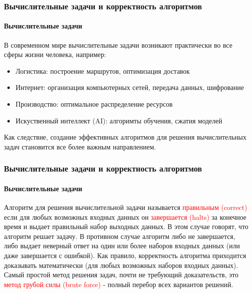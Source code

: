 \documentclass[aspectratio=169]{beamer}
\begin{document}
\begin{frame}
\frametitle{Вычислительные задачи и корректность алгоритмов}
\framesubtitle{Вычислительные задачи}
\justifying
В современном мире вычислительные задачи возникают практически во все сферы жизни человека, например:
\begin{itemize}
\item{Логистика:  построение маршрутов, оптимизация доставок}
\item{Интернет: организация компьютерных сетей, передача данных, шифрование}
\item{Производство: оптимальное распределение ресурсов}
\item{Искуственный интеллект (AI): алгоримты обучения, сжатия моделей}
\end{itemize}

Как следствие, создание эффективных алгоритмов для решения вычислительных задач становится все более важным направлением.

\end{frame}

\begin{frame}
\frametitle{Вычислительные задачи и корректность алгоритмов}
\framesubtitle{Вычислительные задачи}
\justifying
\small
Алгоритм для решения вычислительной задачи называется \textcolor{red}{правильным (correct)} если для любых возможных входных данных он \textcolor{red}{завершается (halts)} за конечное время и выдает правильный набор выходных данных.\newline\newline
В этом случае говорят, что алгоритм решает задачу. В противном случае алгоритм либо не завершается, либо выдает неверный ответ на один или более наборов входных данных (или даже завершается с ошибкой).\newline\newline
Как правило, корректность алгоритма приходится доказывать математически (для любых возможных наборов входных данных).\newline\newline
Самый простой метод решения задач, почти не требующий доказательств, это \textcolor{red}{метод грубой силы (brute force)} - полный перебор всех вариантов решений.

\end{frame}
\end{document}
